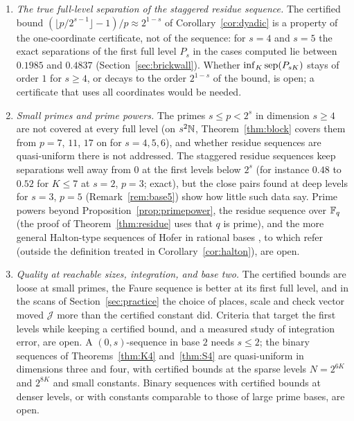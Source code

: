 \begin{enumerate}
\item \emph{The true full-level separation of the staggered residue sequence.} The certified bound $(\lfloor p/2^{s-1}\rfloor-1)/p\approx2^{1-s}$ of Corollary~\ref{cor:dyadic} is a property of the one-coordinate certificate, not of the sequence: for $s=4$ and $s=5$ the exact separations of the first full level $P_s$ in the cases computed lie between $0.1985$ and $0.4837$ (Section~\ref{sec:brickwall}). Whether $\inf_K\operatorname{sep}(P_{sK})$ stays of order $1$ for $s\ge4$, or decays to the order $2^{1-s}$ of the bound, is open; a certificate that uses all coordinates would be needed.
\item \emph{Small primes and prime powers.} The primes $s\le p<2^s$ in dimension $s\ge4$ are not covered at every full level (on $s^2\mathbb{N}$, Theorem~\ref{thm:block} covers them from $p=7$, $11$, $17$ on for $s=4,5,6$), and whether residue sequences are quasi-uniform there is not addressed. The staggered residue sequences keep separations well away from $0$ at the first levels below $2^s$ (for instance $0.48$ to $0.52$ for $K\le7$ at $s=2$, $p=3$; exact), but the close pairs found at deep levels for $s=3$, $p=5$ (Remark~\ref{rem:base5}) show how little such data say. Prime powers beyond Proposition~\ref{prop:primepower}, the residue sequence over $\mathbb{F}_q$ (the proof of Theorem~\ref{thm:residue} uses that $q$ is prime), and the more general Halton-type sequences of Hofer in rational bases \cite{Hof18}, to which \cite{GHS26} refer (outside the definition treated in Corollary~\ref{cor:halton}), are open.
\item \emph{Quality at reachable sizes, integration, and base two.} The certified bounds are loose at small primes, the Faure sequence is better at its first full level, and in the scans of Section~\ref{sec:practice} the choice of places, scale and check vector moved $\mathcal J$ more than the certified constant did. Criteria that target the first levels while keeping a certified bound, and a measured study of integration error, are open. A $(0,s)$-sequence in base $2$ needs $s\le2$; the binary sequences of Theorems~\ref{thm:K4} and~\ref{thm:S4} are quasi-uniform in dimensions three and four, with certified bounds at the sparse levels $N=2^{6K}$ and $2^{8K}$ and small constants. Binary sequences with certified bounds at denser levels, or with constants comparable to those of large prime bases, are open.
\end{enumerate}
